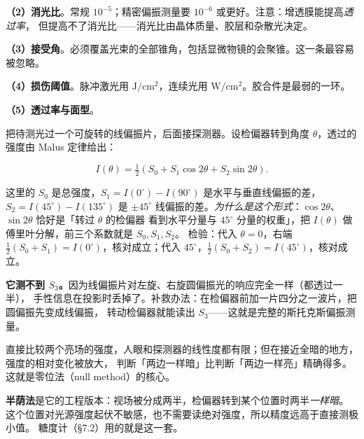 \documentclass[11pt]{ctexart}
\let\subhdrtheme\subhdr
\renewcommand{\subhdr}[1]{\needspace{3\baselineskip}\subhdrtheme{#1}}
\let\hdrorig\hdr
\renewcommand{\hdr}[2]{\needspace{8\baselineskip}\hdrorig{#1}{#2}}
\begin{document}
\textbf{（2）消光比}。常规 $10^{-5}$；精密偏振测量要 $10^{-6}$ 或更好。注意：增透膜能提高\emph{透过率}，
但提高不了消光比——消光比由晶体质量、胶层和杂散光决定。

\textbf{（3）接受角}。必须覆盖光束的全部锥角，包括显微物镜的会聚锥。这一条最容易被忽略。

\textbf{（4）损伤阈值}。脉冲激光用 $\mathrm{J/cm^2}$，连续光用 $\mathrm{W/cm^2}$。胶合件是最弱的一环。

\textbf{（5）透过率与面型}。




把待测光过一个可旋转的线偏振片，后面接探测器。设检偏器转到角度 $\theta$，透过的强度由 Malus 定律给出：

\[
I(\theta)=\tfrac12\left(S_0+S_1\cos2\theta+S_2\sin2\theta\right).
\]

这里的 $S_0$ 是总强度，$S_1=I(0^\circ)-I(90^\circ)$ 是水平与垂直线偏振的差，$S_2=I(45^\circ)-I(135^\circ)$
是 $\pm45^\circ$ 线偏振的差。\emph{为什么是这个形式}：$\cos2\theta$、$\sin2\theta$ 恰好是「转过 $\theta$ 的检偏器
看到水平分量与 $45^\circ$ 分量的权重」，把 $I(\theta)$ 做傅里叶分解，前三个系数就是 $S_0,S_1,S_2$。
检验：代入 $\theta=0$，右端 $\tfrac12(S_0+S_1)=I(0^\circ)$，核对成立；代入 $45^\circ$，$\tfrac12(S_0+S_2)=I(45^\circ)$，核对成立。

\textbf{它测不到 $S_3$。}因为线偏振片对左旋、右旋圆偏振光的响应完全一样（都透过一半），
手性信息在投影时丢掉了。补救办法：在检偏器前加一片四分之一波片，把圆偏振先变成线偏振，
转动检偏器就能读出 $S_3$——这就是完整的斯托克斯偏振测量。


直接比较两个亮场的强度，人眼和探测器的线性度都有限；但在接近全暗的地方，强度的相对变化被放大，
判断「两边一样暗」比判断「两边一样亮」精确得多。这就是零位法（null method）的核心。

\textbf{半荫法}是它的工程版本：视场被分成两半，检偏器转到某个位置时两半\emph{一样暗}。
这个位置对光源强度起伏不敏感，也不需要读绝对强度，所以精度远高于直接测极小值。
糖度计（§7.2）用的就是这一套。
\end{document}
